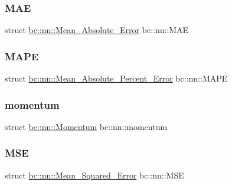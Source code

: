 \mbox{\label{namespacebc_1_1nn_a750f7a0e2cf0394b33d96d0ed4215324}} 
\subsubsection{\texorpdfstring{M\+AE}{MAE}}
{\footnotesize\ttfamily struct \hyperlink{structbc_1_1nn_1_1Mean__Absolute__Error}{bc\+::nn\+::\+Mean\+\_\+\+Absolute\+\_\+\+Error}  bc\+::nn\+::\+M\+AE}

\mbox{\label{namespacebc_1_1nn_a79e2cb825afd655959942b256380f212}} 
\subsubsection{\texorpdfstring{M\+A\+PE}{MAPE}}
{\footnotesize\ttfamily struct \hyperlink{structbc_1_1nn_1_1Mean__Absolute__Percent__Error}{bc\+::nn\+::\+Mean\+\_\+\+Absolute\+\_\+\+Percent\+\_\+\+Error}  bc\+::nn\+::\+M\+A\+PE}

\mbox{\label{namespacebc_1_1nn_a103e3ff34c6a6b393908837f39947b73}} 
\subsubsection{\texorpdfstring{momentum}{momentum}}
{\footnotesize\ttfamily struct \hyperlink{structbc_1_1nn_1_1Momentum}{bc\+::nn\+::\+Momentum}  bc\+::nn\+::momentum}

\mbox{\label{namespacebc_1_1nn_a68f287847db51c1b954a80b67254ea30}} 
\subsubsection{\texorpdfstring{M\+SE}{MSE}}
{\footnotesize\ttfamily struct \hyperlink{structbc_1_1nn_1_1Mean__Squared__Error}{bc\+::nn\+::\+Mean\+\_\+\+Squared\+\_\+\+Error}  bc\+::nn\+::\+M\+SE}

\mbox{\label{namespacebc_1_1nn_ab1183e69180fb5a708babd6a2b1108b9}} 
